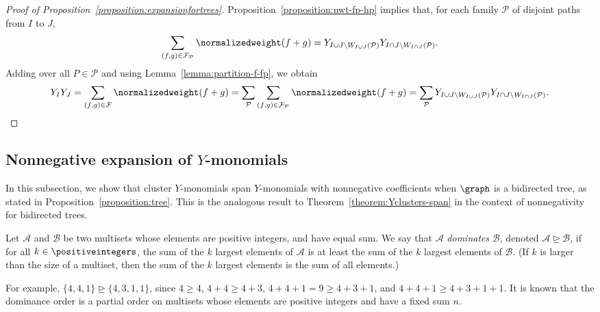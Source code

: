 \begin{proof}[Proof of Proposition~\ref{proposition:expansionfortrees}]
    Proposition~\ref{proposition:nwt-fp-hp} implies that, for each family \(\mathcal{P}\) of disjoint paths from \(I\) to \(J\),
    \begin{equation*}
        \sum_{(f,g) \in \mathcal{F}_{\mathcal{P}}} \normalizedweight(f+g)
        =
        Y_{I \cup J \setminus W_{I \cup J}(\mathcal{P})}
        Y_{I \cap J \setminus W_{I \cap J}(\mathcal{P})}.
    \end{equation*}
    Adding over all \(P \in \mathcal{P}\) and using Lemma~\ref{lemma:partition-f-fp}, we obtain
    \begin{equation*}
        Y_IY_J
        =
        \sum_{(f,g) \in \mathcal{F}} \normalizedweight(f+g)
        =
        \sum_{\mathcal{P}} \sum_{(f,g) \in \mathcal{F}_{\mathcal{P}}} \normalizedweight(f+g)
        =
        \sum_{\mathcal{P}} Y_{I \cup J \setminus W_{I \cup J}(\mathcal{P})}Y_{I \cap J \setminus W_{I \cap J}(\mathcal{P})}. \qedhere
    \end{equation*}
\end{proof}

\subsection{Nonnegative expansion of \texorpdfstring{\(Y\)}{Y}-monomials}\label{subsection:nonnegativeexpansionofY}

In this subsection, we show that cluster \(Y\)-monomials span \(Y\)-monomials with nonnegative coefficients when \(\graph\) is a bidirected tree, as stated in Proposition~\ref{proposition:tree}.
This is the analogous result to Theorem~\ref{theorem:Yclusters-span} in the context of nonnegativity for bidirected trees.

\begin{defi}
    Let \(\mathcal{A}\) and \(\mathcal{B}\) be two multisets whose elements are positive integers,
    and have equal sum.
    We say that \(\mathcal{A}\) \emph{dominates} \(\mathcal{B}\),
    denoted \(\mathcal{A} \trianglerighteq \mathcal{B}\), if for all \(k \in \positiveintegers\),
    the sum of the \(k\) largest elements of \(\mathcal{A}\) is
    at least the sum of the \(k\) largest elements of \(\mathcal{B}\).
    (If \(k\) is larger than the size of a multiset, then the sum of the \(k\) largest elements is the sum of all elements.)
\end{defi}

For example, \(\{4, 4, 1\} \trianglerighteq \{4, 3, 1, 1\}\), since \(4 \geq 4\), \(4 + 4 \geq 4 + 3\), \(4 + 4 + 1 = 9 \geq 4 + 3 + 1\), and \(4 + 4 + 1 \geq 4 + 3 + 1 + 1 \).
It is known that the dominance order is a partial order on multisets whose elements are positive integers and have a fixed sum \(n\).

